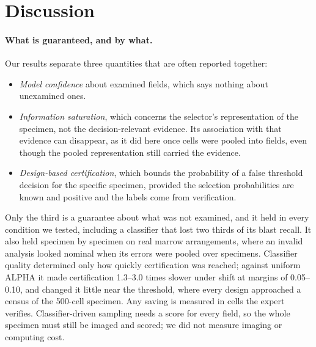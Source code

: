 \documentclass[11pt]{article}
\theoremstyle{remark}
\theoremstyle{definition}
\begin{document}
\section{Discussion}
\paragraph{What is guaranteed, and by what.} Our results separate three quantities that are often reported together:
\begin{itemize}
\item \emph{Model confidence} about examined fields, which says nothing about unexamined ones.
\item \emph{Information saturation}, which concerns the selector's representation of the specimen, not the decision-relevant evidence. Its association with that evidence can disappear, as it did here once cells were pooled into fields, even though the pooled representation still carried the evidence.
\item \emph{Design-based certification}, which bounds the probability of a false threshold decision for the specific specimen, provided the selection probabilities are known and positive and the labels come from verification.
\end{itemize}
Only the third is a guarantee about what was not examined, and it held in every condition we tested, including a classifier that lost two thirds of its blast recall. It also held specimen by specimen on real marrow arrangements, where an invalid analysis looked nominal when its errors were pooled over specimens. Classifier quality determined only how quickly certification was reached; against uniform ALPHA it made certification 1.3--3.0 times slower under shift at margins of 0.05--0.10, and changed it little near the threshold, where every design approached a census of the 500-cell specimen. Any saving is measured in cells the expert verifies. Classifier-driven sampling needs a score for every field, so the whole specimen must still be imaged and scored; we did not measure imaging or computing cost.
\end{document}
